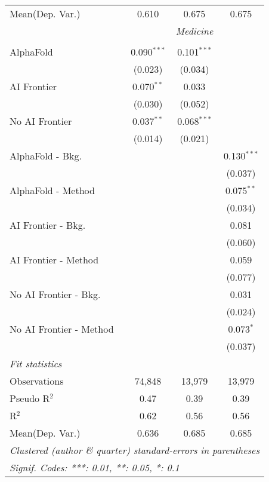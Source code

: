 \begin{tabular}{lccc}
Mean(Dep. Var.) & 0.610 & 0.675 & 0.675 \\
 & \multicolumn{3}{c}{\textit{Medicine}} \\ \\
   AlphaFold               & 0.090$^{***}$ & 0.101$^{***}$ &   \\   
                           & (0.023)       & (0.034)       &   \\   
   AI Frontier             & 0.070$^{**}$  & 0.033         &   \\   
                           & (0.030)       & (0.052)       &   \\   
   No AI Frontier          & 0.037$^{**}$  & 0.068$^{***}$ &   \\   
                           & (0.014)       & (0.021)       &   \\   
   AlphaFold - Bkg.        &               &               & 0.130$^{***}$\\   
                           &               &               & (0.037)\\   
   AlphaFold - Method      &               &               & 0.075$^{**}$\\   
                           &               &               & (0.034)\\   
   AI Frontier - Bkg.      &               &               & 0.081\\   
                           &               &               & (0.060)\\   
   AI Frontier - Method    &               &               & 0.059\\   
                           &               &               & (0.077)\\   
   No AI Frontier - Bkg.   &               &               & 0.031\\   
                           &               &               & (0.024)\\   
   No AI Frontier - Method &               &               & 0.073$^{*}$\\   
                           &               &               & (0.037)\\   
   \midrule
   \emph{Fit statistics}\\
   Observations            & 74,848        & 13,979        & 13,979\\  
   Pseudo R$^2$            & 0.47          & 0.39          & 0.39\\  
   R$^2$                   & 0.62          & 0.56          & 0.56\\  
Mean(Dep. Var.) & 0.636 & 0.685 & 0.685 \\
   \midrule \midrule
   \multicolumn{4}{l}{\emph{Clustered (author \& quarter) standard-errors in parentheses}}\\
   \multicolumn{4}{l}{\emph{Signif. Codes: ***: 0.01, **: 0.05, *: 0.1}}\\
\end{tabular}
\par\endgroup
